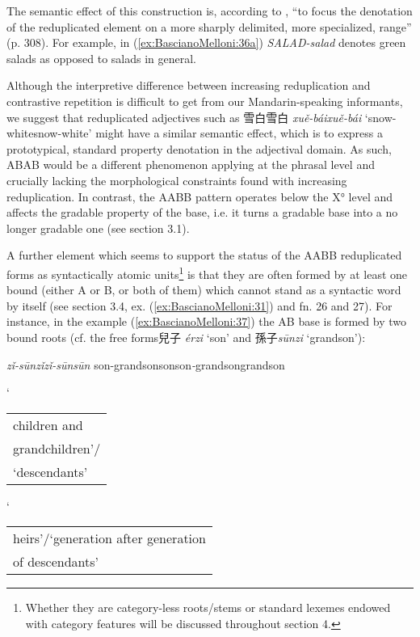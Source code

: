 \documentclass[output=paper]{langsci/langscibook}
\begin{document}
The semantic effect of this construction is, according to %
\citeauthor{GomeshiEtAl2004}%
%
, ``to focus the denotation of the reduplicated element on
a more sharply delimited, more specialized, range'' (p. 308). For
example, in (\ref{ex:BascianoMelloni:36a}) \emph{SALAD-salad} denotes green salads as opposed to
salads in general.

Although the interpretive difference between increasing reduplication
and contrastive repetition is difficult to get from our
Mandarin-speaking informants, we suggest that reduplicated adjectives
such as 雪白雪白 \emph{xuě-bái\tld{}xuě-bái}
`snow-white\emph{\tld{}}snow-white' might have a similar
semantic effect, which is to express a prototypical, standard property
denotation in the adjectival domain. As such, ABAB would be a different
phenomenon applying at the phrasal level and crucially lacking the
morphological constraints found with increasing reduplication. In
contrast, the AABB pattern operates below the X° level and affects the
gradable property of the base, i.e. it turns a gradable base into a no
longer gradable one (see section 3.1).

A further element which seems to support the status of the AABB
reduplicated forms as syntactically atomic units\footnote{Whether they
  are category-less roots/stems or standard lexemes endowed with
  category features will be discussed throughout section 4.} is that
they are often formed by at least one bound  (either A or B, or both
of them) which cannot stand as a syntactic word by itself (see section
3.4, ex. (\ref{ex:BascianoMelloni:31}) and fn. 26 and 27). For instance, in the example (\ref{ex:BascianoMelloni:37}) the AB
base is formed by two bound roots (cf. the free forms兒子 \emph{érzi}
`son' and 孫子\emph{sūnzi} `grandson'):

\ea\label{ex:BascianoMelloni:37}
%
        {\emph{zǐ-sūn}}{\emph{zǐ\tld{}zǐ-sūn\tld{}sūn}}%
        {son-grandson}{son\emph{\tld{}}son\emph{-}grandson\emph{\tld{}}grandson}%
        {`\begin{tabular}[t]{@{}l@{}}children and\\ grandchildren'/\\ `descendants'\end{tabular}}{`\begin{tabular}[t]{@{}l@{}}heirs'/`generation after generation\\ of descendants'\end{tabular}}%
\z
\end{document}
